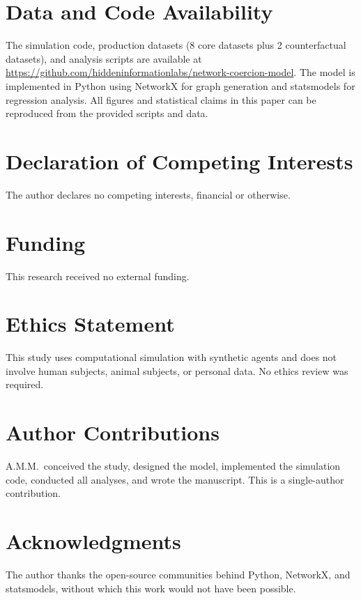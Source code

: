 \documentclass[11pt, a4paper]{article}
\begin{document}
\section*{Data and Code Availability}

The simulation code, production datasets (8 core datasets plus 2 counterfactual datasets), and analysis scripts are available at \url{https://github.com/hiddeninformationlabs/network-coercion-model}. The model is implemented in Python using NetworkX for graph generation and statsmodels for regression analysis. All figures and statistical claims in this paper can be reproduced from the provided scripts and data.

\section*{Declaration of Competing Interests}

The author declares no competing interests, financial or otherwise.

\section*{Funding}

This research received no external funding.

\section*{Ethics Statement}

This study uses computational simulation with synthetic agents and does not involve human subjects, animal subjects, or personal data. No ethics review was required.

\section*{Author Contributions}

A.M.M.\ conceived the study, designed the model, implemented the simulation code, conducted all analyses, and wrote the manuscript. This is a single-author contribution.

\section*{Acknowledgments}

The author thanks the open-source communities behind Python, NetworkX, and statsmodels, without which this work would not have been possible.
\end{document}
